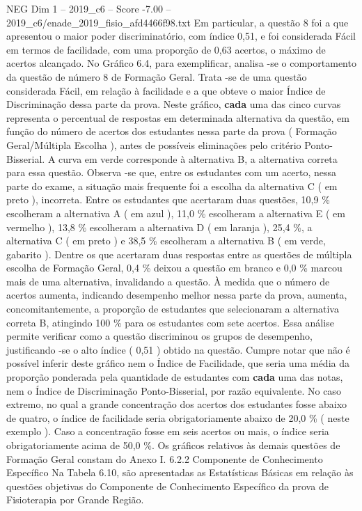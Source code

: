 \begin{textsample}{NEG Dim 1 – 2019\_c6 – Score -7.00 – 2019\_c6/enade\_2019\_fisio\_afd4466f98.txt}
Em particular, a questão 8 foi a que apresentou o maior poder discriminatório, com índice 0,51, e foi considerada Fácil em termos de facilidade, com uma proporção de 0,63 acertos, o máximo de acertos alcançado.
No Gráfico 6.4, para exemplificar, analisa -se o comportamento da questão de número 8 de Formação Geral.
Trata -se de uma questão considerada Fácil, em relação à facilidade e a que obteve o maior Índice de Discriminação dessa parte da prova.
Neste gráfico, \textbf{cada} uma das cinco curvas representa o percentual de respostas em determinada alternativa da questão, em função do número de acertos dos estudantes nessa parte da prova ( Formação Geral/Múltipla Escolha ), antes de possíveis eliminações pelo critério Ponto-Bisserial.
A curva em verde corresponde à alternativa B, a alternativa correta para essa questão.
Observa -se que, entre os estudantes com um acerto, nessa parte do exame, a situação mais frequente foi a escolha da alternativa C ( em preto ), incorreta.
Entre os estudantes que acertaram duas questões, 10,9 \% escolheram a alternativa A ( em azul ), 11,0 \% escolheram a alternativa E ( em vermelho ), 13,8 \% escolheram a alternativa D ( em laranja ), 25,4 \%, a alternativa C ( em preto ) e 38,5 \% escolheram a alternativa B ( em verde, gabarito ).
Dentre os que acertaram duas respostas entre as questões de múltipla escolha de Formação Geral, 0,4 \% deixou a questão em branco e 0,0 \% marcou mais de uma alternativa, invalidando a questão.
À medida que o número de acertos aumenta, indicando desempenho melhor nessa parte da prova, aumenta, concomitantemente, a proporção de estudantes que selecionaram a alternativa correta B, atingindo 100 \% para os estudantes com sete acertos.
Essa análise permite verificar como a questão discriminou os grupos de desempenho, justificando -se o alto índice ( 0,51 ) obtido na questão.
Cumpre notar que não é possível inferir deste gráfico nem o Índice de Facilidade, que seria uma média da proporção ponderada pela quantidade de estudantes com \textbf{cada} uma das notas, nem o Índice de Discriminação Ponto-Bisserial, por razão equivalente.
No caso extremo, no qual a grande concentração dos acertos dos estudantes fosse abaixo de quatro, o índice de facilidade seria obrigatoriamente abaixo de 20,0 \% ( neste exemplo ).
Caso a concentração fosse em seis acertos ou mais, o índice seria obrigatoriamente acima de 50,0 \%.
Os gráficos relativos às demais questões de Formação Geral constam do Anexo I. 6.2.2 Componente de Conhecimento Específico Na Tabela 6.10, são apresentadas as Estatísticas Básicas em relação às questões objetivas do Componente de Conhecimento Específico da prova de Fisioterapia por Grande Região.

\end{textsample}
